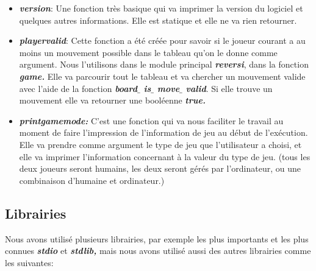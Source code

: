 \documentclass[a4paper,12pt]{article}
\begin{document}
\begin{itemize}
	\item \textbf{\textit{version}}: Une fonction très basique qui va imprimer la version du logiciel et quelques autres informations. Elle est statique et elle ne va rien retourner.\par



	\item \textbf{\textit{playervalid}}: Cette fonction a été créée pour savoir si le joueur courant a au moins un mouvement possible dans le tableau qu’on le donne comme argument. Nous l’utilisons dans le module principal \textbf{\textit{reversi}}, dans la fonction \textbf{\textit{game. }}Elle va parcourir tout le tableau et va chercher un mouvement valide avec l’aide de la fonction \textbf{\textit{board$ \_ $ is$ \_ $ move$ \_ $ valid}}. Si elle trouve un mouvement elle va retourner une booléenne \textbf{\textit{true.}} \textbf{\textit{ }}\par




	\item \textbf{\textit{printgamemode: }}C’est une fonction qui va nous faciliter le travail au moment de faire l’impression de l’information de jeu au début de l’exécution. Elle va prendre comme argument le type de jeu que l’utilisateur a choisi, et elle va imprimer l’information concernant à la valeur du type de jeu. (tous les deux joueurs seront humains, les deux seront gérés par l’ordinateur, ou une combinaison d’humaine et ordinateur.)
\end{itemize}\par


\noindent  \par


\noindent \subsection{Librairies}\par


\noindent Nous avons utilisé plusieurs librairies, par exemple les plus importants et les plus connues \textbf{\textit{stdio }}et \textbf{\textit{stdlib, }}mais nous avons utilisé aussi des autres librairies comme les suivantes:\par
\end{document}
